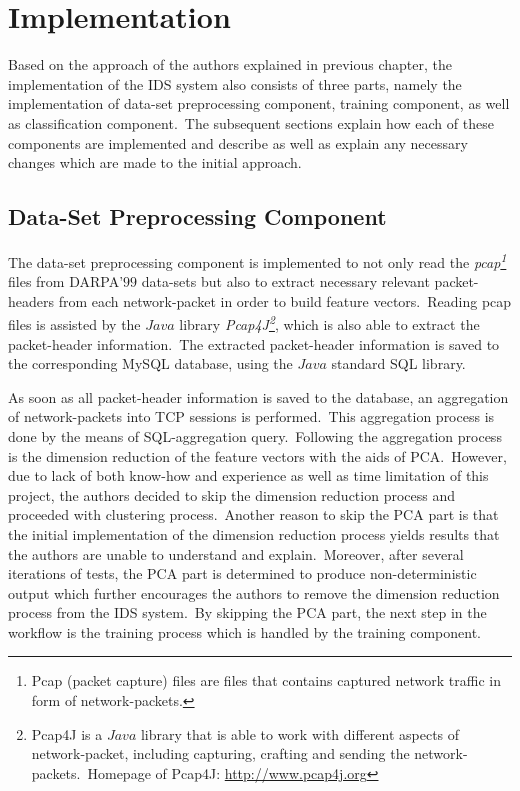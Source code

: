 \chapter{Implementation}
\label{implementation}

	Based on the approach of the authors explained in previous chapter, the implementation of the IDS system also consists of three parts, namely the implementation of data-set preprocessing component, training component, as well as classification component.\ The subsequent sections explain how each of these components are implemented and describe as well as explain any necessary changes which are made to the initial approach.

	\section{Data-Set Preprocessing Component}
	\label{dataSetPreprocessingComponent}
		
		The data-set preprocessing component is implemented to not only read the \textit{pcap\footnote{Pcap (packet capture) files are files that contains captured network traffic in form of network-packets.}} files from DARPA'$99$ data-sets but also to extract necessary relevant packet-headers from each network-packet in order to build feature vectors.\ Reading pcap files is assisted by the $Java$ library \textit{Pcap4J\footnote{Pcap4J is a $Java$ library that is able to work with different aspects of network-packet, including capturing, crafting and sending the network-packets.\ Homepage of Pcap4J: \url{http://www.pcap4j.org}}}, which is also able to extract the packet-header information.\ The extracted packet-header information is saved to the corresponding MySQL database, using the $Java$ standard SQL library.

		 As soon as all packet-header information is saved to the database, an aggregation of network-packets into TCP sessions is performed.\ This aggregation process is done by the means of SQL-aggregation query.\ Following the aggregation process is the dimension reduction of the feature vectors with the aids of PCA.\ However, due to lack of both know-how and experience as well as time limitation of this project, the authors decided to skip the dimension reduction process and proceeded with clustering process.\ Another reason to skip the PCA part is that the initial implementation of the dimension reduction process yields results that the authors are unable to understand and explain.\ Moreover, after several iterations of tests, the PCA part is determined to produce non-deterministic output which further encourages the authors to remove the dimension reduction process from the IDS system.\ By skipping the PCA part, the next step in the workflow is the training process which is handled by the training component.
		 
